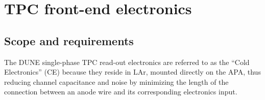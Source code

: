 





\section{TPC front-end electronics}
\label{ch:ce}

%
\subsection{Scope and requirements}
\label{subsec:ce_intro}


The DUNE single-phase TPC read-out electronics are referred to as the ``Cold Electronics'' (CE) because they reside in LAr,
mounted directly on the APA, %
thus reducing channel capacitance and noise by minimizing the length of the connection between an anode wire
and its corresponding electronics input.

